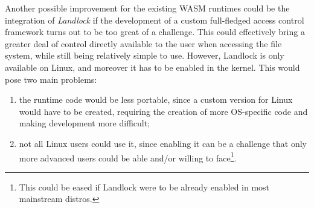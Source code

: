 Another possible improvement for the existing WASM runtimes could be the integration of \textit{Landlock}
if the development of a custom full-fledged access control framework turns out to be too great of
a challenge.
This could effectively bring a greater deal of control directly available to the user when
accessing the file system, while still being relatively simple to use.
However, Landlock is only available on Linux, and moreover it has to be enabled in the kernel.
This would pose two main problems:
\begin{enumerate}
  \item the runtime code would be less portable, since a custom version for Linux would have to be created, requiring
        the creation of more OS-specific code and making development more difficult;
  \item not all Linux users could use it, since enabling it can be a challenge that only more advanced users
        could be able and/or willing to face\footnote{This could be eased if Landlock were to be already enabled in most mainstream distros.}.
\end{enumerate}
